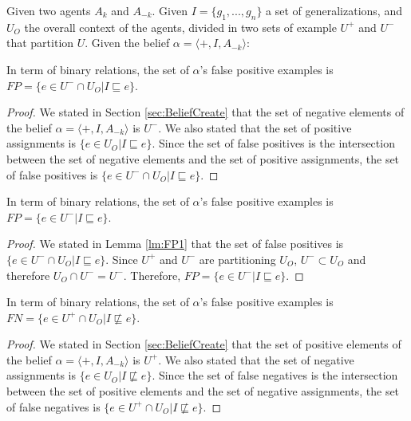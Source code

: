 Given two agents $A_{k}$ and $A_{-k}$. Given $I = \{ g_{1}, ..., g_{n} \}$ a set of generalizations, and $U_{O}$ the overall context of the agents, divided in two sets of example $U^{+}$ and $U^{-}$ that partition $U$. Given the belief $\alpha = \langle +, I, A_{-k} \rangle$:

\begin{lemma}\label{lm:FP1}
In term of binary relations, the set of $\alpha$'s false positive examples is $FP = \{ e \in U^{-} \cap U_{O} | I \sqsubseteq e \}$.
\end{lemma}

\begin{proof}
We stated in Section \ref{sec:BeliefCreate} that the set of negative elements of the belief $\alpha = \langle +, I, A_{-k} \rangle$ is $U^{-}$. We also stated that the set of positive assignments is  $\{ e \in U_{O} | I \sqsubseteq e \}$. Since the set of false positives is the intersection between the set of negative elements and the set of positive assignments, the set of false positives is $\{ e \in U^{-} \cap U_{O} | I \sqsubseteq e \}$.
\end{proof}

\begin{lemma}\label{lm:FP2}
In term of binary relations, the set of $\alpha$'s false positive examples is $FP = \{ e \in U^{-} | I \sqsubseteq e \}$.
\end{lemma}

\begin{proof}
We stated in Lemma \ref{lm:FP1} that the set of false positives is $\{ e \in U^{-} \cap U_{O} | I \sqsubseteq e \}$. Since $U^{+}$ and $U^{-}$ are partitioning $U_{O}$, $U^{-} \subset U_{O}$ and therefore $U_{O} \cap U^{-} = U^{-}$. Therefore, $FP = \{ e \in U^{-} | I \sqsubseteq e \}$.
\end{proof}

\begin{lemma}\label{lm:FN1}
In term of binary relations, the set of $\alpha$'s false positive examples is $FN = \{ e \in U^{+} \cap U_{O} | I \not \sqsubseteq e \}$.
\end{lemma}

\begin{proof}
We stated in Section \ref{sec:BeliefCreate} that the set of positive elements of the belief $\alpha = \langle +, I, A_{-k} \rangle$ is $U^{+}$. We also stated that the set of negative assignments is  $\{ e \in U_{O} | I \not\sqsubseteq e \}$. Since the set of false negatives is the intersection between the set of positive elements and the set of negative assignments, the set of false negatives is $\{ e \in U^{+} \cap U_{O} | I \not \sqsubseteq e \}$.
\end{proof}

